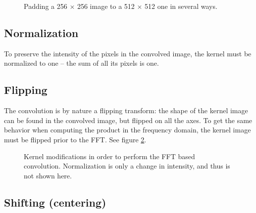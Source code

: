 \documentclass{InsightArticle}
\begin{document}
\begin{figure}[htbp]
\begin{center}
\caption{Padding a 256 $\times$ 256 image to a 512 $\times$ 512 one in several ways.\label{fig:padding}}
\end{center}
\end{figure}


\subsection{Normalization}

To preserve the intensity of the pixels in the convolved image, the kernel must be normalized to one
-- the sum of all its pixels is one.

\subsection{Flipping}

The convolution is by nature a flipping transform: the shape of the kernel image can be found in the
convolved image, but flipped on all the axes. To get the same behavior when computing the product
in the frequency domain, the kernel image must be flipped prior to the FFT. See figure \ref{fig:kernel-modifications}.

\begin{figure}[htbp]
\begin{center}
\caption{Kernel modifications in order to perform the FFT based convolution. Normalization is
only a change in intensity, and thus is not shown here.\label{fig:kernel-modifications}}
\end{center}
\end{figure}

\subsection{Shifting (centering)}
\end{document}
